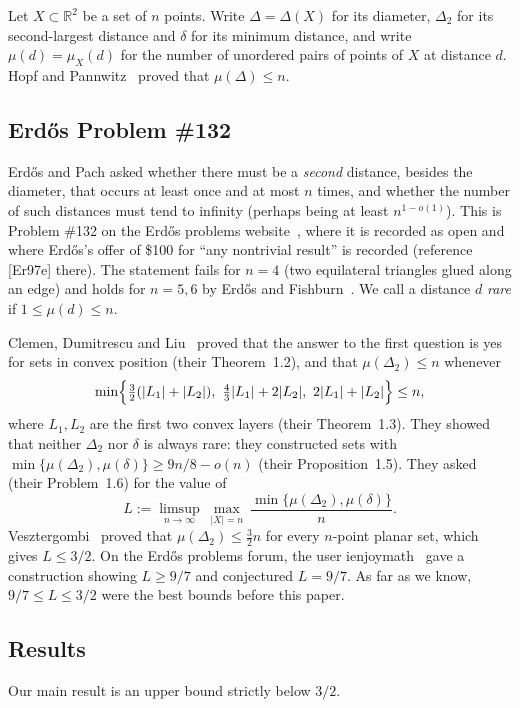\documentclass[11pt]{amsart}
\theoremstyle{definition}
\theoremstyle{remark}
\newcommand{\R}{\mathbb{R}}
\newcommand{\Dt}{\Delta_2}
\newcommand{\mult}{\mu}
\begin{document}
Let $X\subset\R^2$ be a set of $n$ points. Write $\Delta=\Delta(X)$ for its diameter, $\Dt$ for its second-largest distance and $\delta$ for its minimum distance, and write $\mult(d)=\mult_X(d)$ for the number of unordered pairs of points of $X$ at distance $d$. Hopf and Pannwitz~\cite{HP34} proved that $\mult(\Delta)\le n$.

\subsection*{Erd\H{o}s Problem \#132}
Erd\H{o}s and Pach asked whether there must be a \emph{second} distance, besides the diameter, that occurs at least once and at most $n$ times, and whether the number of such distances must tend to infinity (perhaps being at least $n^{1-o(1)}$). This is Problem \#132 on the Erd\H{o}s problems website~\cite{EP132}, where it is recorded as open and where Erd\H{o}s's offer of \$100 for ``any nontrivial result'' is recorded (reference [Er97e] there). The statement fails for $n=4$ (two equilateral triangles glued along an edge) and holds for $n=5,6$ by Erd\H{o}s and Fishburn~\cite{EF95a}. We call a distance $d$ \emph{rare} if $1\le\mult(d)\le n$.

Clemen, Dumitrescu and Liu~\cite{CDL25} proved that the answer to the first question is yes for sets in convex position (their Theorem~1.2), and that $\mult(\Dt)\le n$ whenever
\begin{equation}\label{eq:cdl13}
\min\Bigl\{\tfrac32(|L_1|+|L_2|),\ \tfrac43|L_1|+2|L_2|,\ 2|L_1|+|L_2|\Bigr\}\le n,
\end{equation}
where $L_1,L_2$ are the first two convex layers (their Theorem~1.3). They showed that neither $\Dt$ nor $\delta$ is always rare: they constructed sets with $\min\{\mult(\Dt),\mult(\delta)\}\ge 9n/8-o(n)$ (their Proposition~1.5). They asked (their Problem~1.6) for the value of
\[
L:=\limsup_{n\to\infty}\ \max_{|X|=n}\ \frac{\min\{\mult(\Dt),\mult(\delta)\}}{n}.
\]
Vesztergombi~\cite{Ve87} proved that $\mult(\Dt)\le\frac32 n$ for every $n$-point planar set, which gives $L\le 3/2$. On the Erd\H{o}s problems forum, the user ienjoymath~\cite{ienjoymath} gave a construction showing $L\ge 9/7$ and conjectured $L=9/7$. As far as we know, $9/7\le L\le 3/2$ were the best bounds before this paper.

\subsection*{Results}
Our main result is an upper bound strictly below $3/2$.
\end{document}
